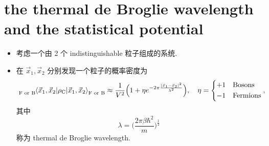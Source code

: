 \section{the thermal de Broglie wavelength and the statistical potential}
\begin{itemize}
	\item 考虑一个由 2 个 indistinguishable 粒子组成的系统.
	
	\item 在 $\vec{x}_1, \vec{x}_2$ 分别发现一个粒子的概率密度为
	\begin{equation} \label{5.4.1}
		\tensor[_{\text{F or B}}]{\braket{\vec{x}_1, \vec{x}_2 | \rho_\text{C} | \vec{x}_1, \vec{x}_2}}{_{\text{F or B}}} \approx \frac{1}{V^2} \Big( 1 + \eta e^{- 2 \pi \frac{|\vec{x}_1 - \vec{x}_2|^2}{\lambda^2}} \Big), \quad \eta = \begin{dcases}
			+ 1 & \text{Bosons} \\
			- 1 & \text{Fermions}
		\end{dcases},
	\end{equation}
	其中
	\begin{equation}
		\lambda = \Big( \frac{2 \pi \beta \hbar^2}{m} \Big)^{\frac{1}{2}}
	\end{equation}
	称为 thermal de Broglie wavelength.
	

\end{itemize}
